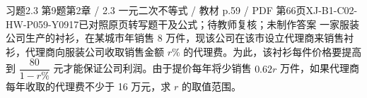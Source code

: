 \par\noindent\begin{minipage}{\linewidth}
\begin{bankitem}{习题2.3 第9题}{第2章 / 2.3 一元二次不等式 / 教材 p.59 / PDF 第66页}{XJ-B1-C02-HW-P059-Y0917}{已对照原页转写题干及公式；待教师复核；未制作答案}
一家服装公司生产的衬衫，在某城市年销售 8 万件，现该公司在该市设立代理商来销售衬衫，代理商向服装公司收取销售金额 $r\%$ 的代理费。为此，该衬衫每件价格要提高到 $\dfrac{80}{1-r\%}$ 元才能保证公司利润。由于提价每年将少销售 $0.62r$ 万件，如果代理商每年收取的代理费不少于 16 万元，求 $r$ 的取值范围。
\end{bankitem}
\end{minipage}\par\medskip

